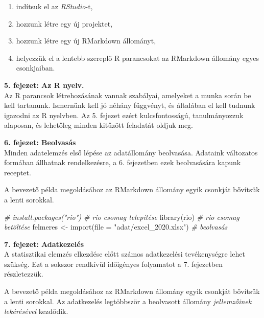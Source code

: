 \documentclass[
]{book}
\newenvironment{Shaded}{\begin{snugshade}}{\end{snugshade}}
\newcommand{\AttributeTok}[1]{\textcolor[rgb]{0.77,0.63,0.00}{#1}}
\newcommand{\CommentTok}[1]{\textcolor[rgb]{0.56,0.35,0.01}{\textit{#1}}}
\newcommand{\FunctionTok}[1]{\textcolor[rgb]{0.00,0.00,0.00}{#1}}
\newcommand{\NormalTok}[1]{#1}
\newcommand{\OtherTok}[1]{\textcolor[rgb]{0.56,0.35,0.01}{#1}}
\newcommand{\SpecialCharTok}[1]{\textcolor[rgb]{0.00,0.00,0.00}{#1}}
\newcommand{\StringTok}[1]{\textcolor[rgb]{0.31,0.60,0.02}{#1}}
\providecommand{\tightlist}{%
  \setlength{\itemsep}{0pt}\setlength{\parskip}{0pt}}
\begin{document}
\begin{enumerate}
\def\labelenumi{\arabic{enumi}.}
\tightlist
\item
  indítsuk el az \emph{RStudio}-t,
\item
  hozzunk létre egy új projektet,
\item
  hozzunk létre egy új RMarkdown állományt,
\item
  helyezzük el a lentebb szereplő R parancsokat az RMarkdown állomány egyes csonkjaiban.
\end{enumerate}

\textbf{5. fejezet: Az R nyelv.}\\
Az R parancsok létrehozásának vannak szabályai, amelyeket a munka során be kell tartanunk. Ismernünk kell jó néhány függvényt, és általában el kell tudnunk igazodni az R nyelvben. Az 5. fejezet ezért kulcsfontosságú, tanulmányozzuk alaposan, és lehetőleg minden kitűzött feladatát oldjuk meg.

\textbf{6. fejezet: Beolvasás}\\
Minden adatelemzés első lépése az adatállomány beolvasása. Adataink változatos formában állhatnak rendelkezésre, a 6. fejezetben ezek beolvasására kapunk receptet.

A bevezető példa megoldásához az RMarkdown állomány egyik csonkját bővítsük a lenti sorokkal.

\begin{Shaded}
\begin{Highlighting}[]
\CommentTok{\# install.packages("rio")                         \# rio csomag telepítése}
\FunctionTok{library}\NormalTok{(rio)                                      }\CommentTok{\# rio csomag betöltése}
\NormalTok{felmeres }\OtherTok{\textless{}{-}} \FunctionTok{import}\NormalTok{(}\AttributeTok{file =} \StringTok{"adat/excel\_2020.xlsx"}\NormalTok{) }\CommentTok{\# beolvasás}
\end{Highlighting}
\end{Shaded}

\textbf{7. fejezet: Adatkezelés}\\
A statisztikai elemzés elkezdése előtt számos adatkezelési tevékenységre lehet szükség. Ezt a sokszor rendkívül időigényes folyamatot a 7. fejezetben részletezzük.

A bevezető példa megoldásához az RMarkdown állomány egyik csonkját bővítsük a lenti sorokkal. Az adatkezelés legtöbbször a beolvasott állomány \emph{jellemzőinek lekérésével} kezdődik.

\begin{Shaded}
\end{Shaded}
\end{document}
